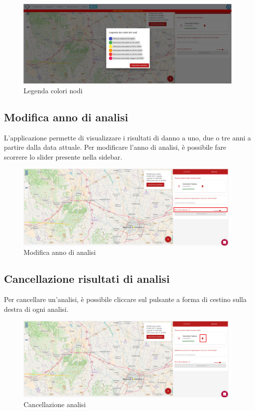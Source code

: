 	\begin{figure}[H]
	\centering
	\includegraphics[width=\textwidth]{img/legenda_colori.png}
	\caption{Legenda colori nodi}
	\end{figure}

\subsection{Modifica anno di analisi}
	L'applicazione permette di visualizzare i risultati di danno a uno, due o tre anni a partire dalla data attuale. Per modificare l'anno di analisi, è possibile fare scorrere lo slider presente nella sidebar.
	
	\begin{figure}[H]
		\centering
		\includegraphics[width=\textwidth]{img/modifica_anno_analisi.png}
		\caption{Modifica anno di analisi}
	\end{figure}

\subsection{Cancellazione risultati di analisi}
	Per cancellare un'analisi, è possibile cliccare sul pulsante a forma di cestino sulla destra di ogni analisi.
	
	\begin{figure}[H]
		\centering
		\includegraphics[width=\textwidth]{img/cancellazione_analisi.png}
		\caption{Cancellazione analisi}
	\end{figure}


